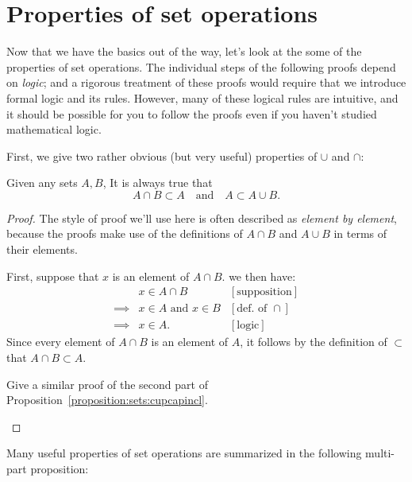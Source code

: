 \section{Properties of set operations}

Now that we have the basics out of the way, let's look at the some of  the properties of set operations.
The individual steps of the following proofs depend on \emph{logic}; and a rigorous treatment  of these proofs would require that we introduce formal logic and its rules. However, many of these logical rules are intuitive, and it should be possible for you to follow the proofs even if you haven't studied mathematical logic.

 First, we give two rather obvious (but very useful) properties of $\cup$ and $\cap$:

\begin{prop}\label{proposition:sets:cupcapincl}
Given any sets $A,B$, It is always true that
\[
A \cap B \subset A \text{~~~and~~~}A \subset A \cup B.
\]
\end{prop}
\begin{proof}
The style of proof we'll use here  is often described as \emph{element by element}, because the proofs make use of the definitions of $A\cap B$ and $A\cup B$ in terms of their elements. 

First, suppose that $x$ is an element of $A \cap B$. we then have:
\begin{align*}
&x \in A \cap B &[\text{supposition}]\\
\implies &x \in A \text{ and } x\in B &[\text{def. of }\cap]\\
\implies &x \in A.&[\text{logic}]
\end{align*}
Since every element of $A \cap B$ is an element of $A$, it follows by the definition of $\subset$ that $A \cap B \subset A$.

\begin{exercise}\label{exercise:sets:23}
Give a similar proof of the second part of Proposition~\ref{proposition:sets:cupcapincl}.
\end{exercise}
\end{proof}

Many useful properties of set operations are summarized in the following multi-part proposition: 

